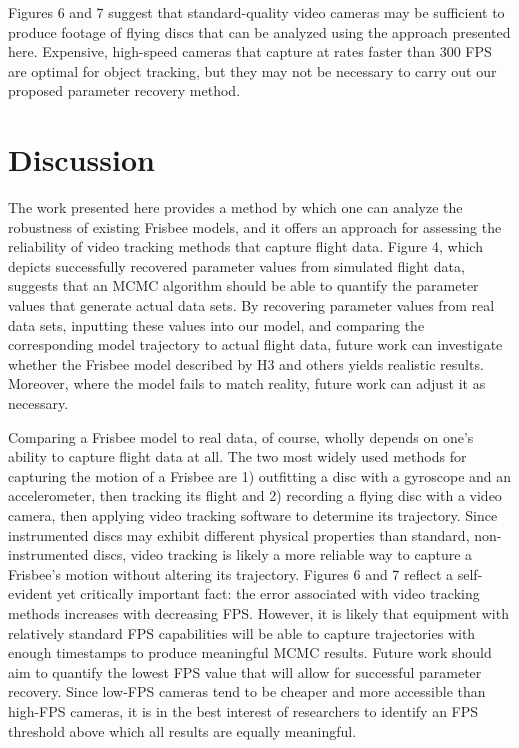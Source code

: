 \documentclass[a4paper,12pt, oneside]{article}
\begin{document}
Figures 6 and 7 suggest that standard-quality video cameras may be sufficient to produce footage of flying discs that can be analyzed using the approach presented here. Expensive, high-speed cameras that capture at rates faster than 300 FPS are optimal for object tracking, but they may not be necessary to carry out our proposed parameter recovery method.

\section{Discussion}
The work presented here provides a method by which one can analyze the robustness of existing Frisbee models, and it offers an approach for assessing the reliability of video tracking methods that capture flight data.  Figure 4, which depicts successfully recovered parameter values from simulated flight data, suggests that an MCMC algorithm should be able to quantify the parameter values that generate actual data sets. By recovering parameter values from real data sets, inputting these values into our model, and comparing the corresponding model trajectory to actual flight data, future work can investigate whether the Frisbee model described by H3 and others yields realistic results. Moreover, where the model fails to match reality, future work can adjust it as necessary. 

Comparing a Frisbee model to real data, of course, wholly depends on one's ability to capture flight data at all. The two most widely used methods for capturing the motion of a Frisbee are 1) outfitting a disc with a gyroscope and an accelerometer, then tracking its flight and 2) recording a flying disc with a video camera, then applying video tracking software to determine its trajectory. Since instrumented discs may exhibit different physical properties than standard, non-instrumented discs, video tracking is likely a more reliable way to capture a Frisbee's motion without altering its trajectory. Figures 6 and 7 reflect a self-evident yet critically important fact: the error associated with video tracking methods increases with decreasing FPS. However, it is likely that equipment with relatively standard FPS capabilities will be able to capture trajectories with enough timestamps to produce meaningful MCMC results. Future work should aim to quantify the lowest FPS value that will allow for successful parameter recovery. Since low-FPS cameras tend to be cheaper and more accessible than high-FPS cameras, it is in the best interest of researchers to identify an FPS threshold above which all results are equally meaningful. 
\end{document}
